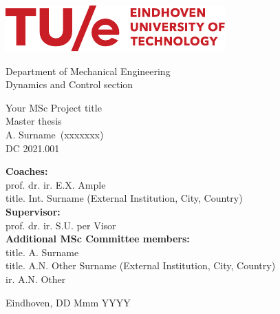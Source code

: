 \documentclass[11pt]{report}
\numberwithin{equation}{chapter}		%
\numberwithin{figure}{chapter}			%
\numberwithin{table}{chapter}			%
\newcommand{\deltitle}{Your MSc Project title}        %
\newcommand{\StudentName}{A. Surname}               %
\newcommand{\StudentID}{xxxxxxx}                    %
\newcommand{\DCcode}{2021.001}                      %
\begin{document}
	\hypersetup{pageanchor=false}
	\begin{titlepage}
	\centering
	\includegraphics[scale=1.9]{graphics/TUE-logo.pdf}\\[0mm]
	\begin{center}
		{\Large Department of Mechanical Engineering}\\[2mm]
		{\Large Dynamics and Control section}\\[20mm]
	\end{center}

	\begin{center}
		{\Huge \deltitle}\\[2mm]
		{\Large Master thesis}\\[2mm]
		{\large \StudentName \ (\StudentID)}\\[1mm]
		{\large DC \DCcode}\\[70mm]
	\end{center}
		
	\flushleft\large {\textbf{Coaches:}} \\
	{prof. dr. ir. E.X. Ample}   \\    
	{title. Int. Surname (External Institution, City, Country)}  \\ %


	\flushleft\large {\textbf{Supervisor:}} \\
	{prof. dr. ir. S.U. per Visor}             \\

	\flushleft\large {\textbf{Additional MSc Committee members:}} \\
	{title. A. Surname}  \\  
	{title. A.N. Other Surname (External Institution, City, Country)}  \\  %
	{ir. A.N. Other}                 

	\vfill\center Eindhoven, DD Mmm YYYY \\ %
		
	\end{titlepage}

	\hypersetup{pageanchor=true}
\end{document}
